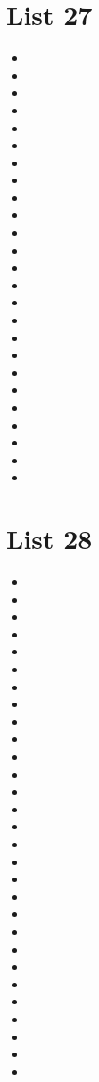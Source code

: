 \documentclass[a4paper,10pt]{article}
\begin{document}
\begin{CJK*}{UTF8}{gkai}
\newpage
\section{List 27}
\begin{itemize}
\item 
\item 
\item 
\item 
\item 
\item 
\item 
\item 
\item 
\item 
\item 
\item 
\item 
\item 
\item 
\item 
\item 
\item 
\item 
\item 
\item 
\item 
\item 
\item 
\item 
\end{itemize}

\newpage
\section{List 28}
\begin{itemize}
\item 
\item 
\item 
\item 
\item 
\item 
\item 
\item 
\item 
\item 
\item 
\item 
\item 
\item 
\item 
\item 
\item 
\item 
\item 
\item 
\item 
\item 
\item 
\item 
\item 
\item 
\item 
\item 
\item 
\end{itemize}


\end{CJK*}
\end{document}
